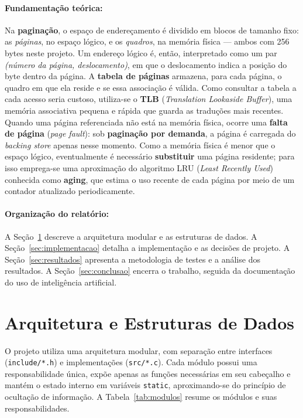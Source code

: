 \documentclass[11pt,a4paper]{article}
\begin{document}
\paragraph{Fundamentação teórica:}
Na \textbf{paginação}, o espaço de endereçamento é dividido em blocos de tamanho
fixo: as \textit{páginas}, no espaço lógico, e os \textit{quadros}, na memória
física --- ambos com 256 bytes neste projeto. Um endereço lógico é, então,
interpretado como um par \textit{(número da página, deslocamento)}, em que o
deslocamento indica a posição do byte dentro da página. A \textbf{tabela de
páginas} armazena, para cada página, o quadro em que ela reside e se essa
associação é válida. Como consultar a tabela a cada acesso seria custoso,
utiliza-se o \textbf{TLB} (\textit{Translation Lookaside Buffer}), uma
memória associativa pequena e rápida que guarda as traduções mais recentes.
Quando uma página referenciada não está na memória física, ocorre uma
\textbf{falta de página} (\textit{page fault}): sob \textbf{paginação por
demanda}, a página é carregada do \textit{backing store} apenas nesse momento.
Como a memória física é menor que o espaço lógico, eventualmente é necessário
\textbf{substituir} uma página residente; para isso emprega-se uma aproximação
do algoritmo LRU (\textit{Least Recently Used}) conhecida como \textbf{aging},
que estima o uso recente de cada página por meio de um contador atualizado
periodicamente.

\paragraph{Organização do relatório:}
A Seção~\ref{sec:arquitetura} descreve a arquitetura modular e as estruturas de
dados. A Seção~\ref{sec:implementacao} detalha a implementação e as decisões de
projeto. A Seção~\ref{sec:resultados} apresenta a metodologia de testes e a
análise dos resultados. A Seção~\ref{sec:conclusao} encerra o trabalho, seguida
da documentação do uso de inteligência artificial.

\section{Arquitetura e Estruturas de Dados}
\label{sec:arquitetura}

O projeto utiliza uma arquitetura modular, com separação entre interfaces
(\texttt{include/*.h}) e implementações (\texttt{src/*.c}). Cada módulo possui
uma responsabilidade única, expõe apenas as funções necessárias em seu cabeçalho
e mantém o estado interno em variáveis \texttt{static}, aproximando-se do
princípio de ocultação de informação. A Tabela~\ref{tab:modulos} resume os
módulos e suas responsabilidades.
\end{document}
